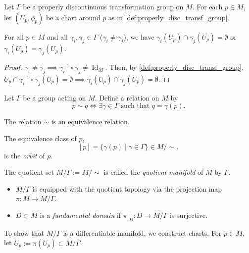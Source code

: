 Let $\Gamma$ be a properly discontinuous transformation group on $M$.
For each $p \in M$, let $(U_p, \phi_p)$ be a chart around $p$ as in \autoref{def:properly_disc_transf_group}.

\begin{lemma}
For all $p\in M$ and all $\gamma_i, \gamma_j \in \Gamma$ ($\gamma_i \neq \gamma_j$), we have $\gamma_i(U_p) \cap \gamma_j(U_p) = \emptyset$ or $\gamma_i(U_p) = \gamma_j(U_p)$.
\label{lemma:disjoint_or_equal}
\end{lemma}

\begin{proof}
    $\gamma_i \neq \gamma_j \implies \gamma_i^{-1}\circ\gamma_j\neq\operatorname{Id}_M$. Then, by \autoref{def:properly_disc_transf_group},
    $U_p \cap \gamma_i^{-1}\circ\gamma_j(U_p) = \emptyset \implies \gamma_i(U_p) \cap \gamma_j(U_p) = \emptyset$.
\end{proof}

\begin{definition}
Let $\Gamma$ be a group acting on $M$. Define a relation on $M$ by
\[
p \sim q \iff \exists \gamma \in \Gamma \text{ such that } q = \gamma(p).
\]
\end{definition}

\begin{proposition}
The relation $\sim$ is an equivalence relation.
\end{proposition}

\begin{definition}[Orbit]
The equivalence class of $p$,
\[
[p] = \{ \gamma(p) \mid \gamma \in \Gamma \} \in M/\sim,
\]
is  the \emph{orbit} of $p$.
\end{definition}

\begin{definition}
The quotient set $M/\Gamma := M/\sim$ is called the \emph{quotient manifold} of $M$ by $\Gamma$.
\begin{itemize}
    \item $M/\Gamma$ is equipped with the quotient topology via the projection map $\pi: M \to M/\Gamma$.
    \item $D \subset M$ is a \emph{fundamental domain} if $\pi|_D:D \to M/\Gamma$ is surjective.
\end{itemize}
\end{definition}

To show that $M/\Gamma$ is a differentiable manifold, we construct charts.
For $p \in M$, let $\hat{U}_p := \pi(U_p) \subset M/\Gamma$.

